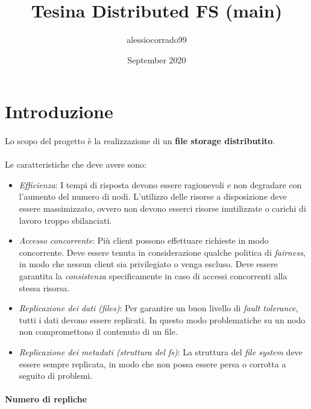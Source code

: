 \documentclass{article}
\title{Tesina Distributed FS (main)}
\author{alessiocorrado99 }
\date{September 2020}
\begin{document}
\maketitle
\tableofcontents

\section{Introduzione} 

\paragraph{} Lo scopo del progetto è la realizzazione di un \textbf{file storage distributito}. 

\paragraph{} Le caratteristiche che deve avere sono:

\begin{itemize}
	\item \emph{Efficienza}: I tempi di risposta devono essere ragionevoli e non degradare con l'aumento del numero di nodi. L'utilizzo delle risorse a disposizione deve essere massimizzato, ovvero non devono esserci risorse inutilizzate o carichi di lavoro troppo sbilanciati.  
	
	\item \emph{Accesso concorrente}: Più client possono effettuare richieste in modo concorrente. Deve essere tenuta in considerazione qualche politica di \emph{fairness}, 
	in modo che nessun client sia privilegiato o venga escluso. Deve essere garantita la 
	\emph{consistenza} specificamente in caso di accessi concorrenti alla stessa risorsa. 
	 
	\item \emph{Replicazione dei dati (files)}: Per garantire un buon livello di \emph{fault tolerance}, tutti i dati devono essere replicati. In questo modo problematiche su un nodo non compromettono il contenuto di un file. 
	
	\item \emph{Replicazione dei metadati (struttura del fs)}: La struttura del \emph{file system} deve essere sempre replicata, in modo che non possa essere persa o corrotta a seguito di problemi. 
\end{itemize} 



\paragraph{Numero di repliche}
\end{document}
